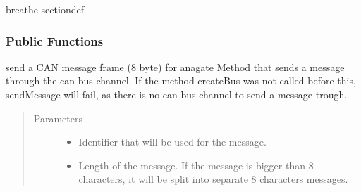 \documentclass[a4paper,10pt,english]{sphinxmanual}
\begin{document}
\begin{fulllineitems}
\label{\detokenize{classestracing:_CPPv410AnaCanScan}}%
\pysigstartmultiline
{}%
\pysigstopmultiline
\begin{sphinxuseclass}{breathe-sectiondef}\subsubsection*{Public Functions}

\begin{fulllineitems}
\label{\detokenize{classestracing:_CPPv4N10AnaCanScan11sendMessageEshPhb}}%
\pysigstartmultiline
{}%
\pysigstopmultiline
\sphinxAtStartPar
send a CAN message frame (8 byte) for anagate Method that sends a message through the can bus channel. If the method createBus was not called before this, sendMessage will fail, as there is no can bus channel to send a message trough. 
\begin{quote}\begin{description}
\item[{Parameters}] \leavevmode\begin{itemize}
\item {} 
\sphinxAtStartPar
{} \textendash{} Identifier that will be used for the message. 

\item {} 
\sphinxAtStartPar
{} \textendash{} Length of the message. If the message is bigger than 8 characters, it will be split into separate 8 characters messages. 


\end{itemize}
\end{description}
\end{quote}
\end{fulllineitems}
\end{sphinxuseclass}
\end{fulllineitems}
\end{document}
